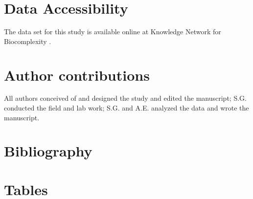 \documentclass{article}
\begin{document}
\section*{Data Accessibility}
The data set for this study is available online at Knowledge Network for Biocomplexity \citep{gee2017}. 

\section*{Author contributions} All authors conceived of and designed the study and edited the manuscript; S.G. conducted the field and lab work; S.G. and A.E. analyzed the data and wrote the manuscript.

\section{Bibliography}


\section* {Tables}
\end{document}
